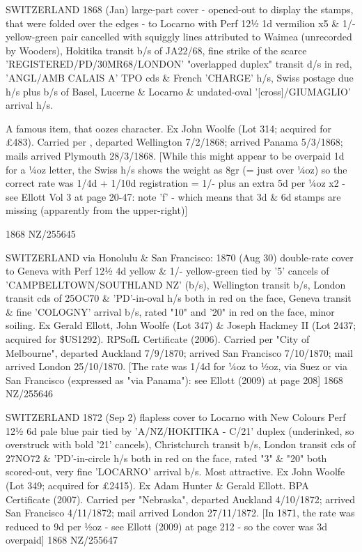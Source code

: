 \documentclass[justified]{tufte-book}
\begin{document}
%
{SWITZERLAND 1868 (Jan) large-part cover - opened-out to display the stamps, that were folded over the edges - to Locarno with Perf 12½ 1d vermilion x5 \& 1/- yellow-green pair cancelled with squiggly lines attributed to Waimea (unrecorded by Wooders), Hokitika transit b/s of JA22/68, fine strike of the scarce 'REGISTERED/PD/30MR68/LONDON' "overlapped duplex" transit d/s in red, 'ANGL/AMB CALAIS A' TPO cds \& French 'CHARGE' h/s, Swiss postage due h/s plus b/s of Basel, Lucerne \& Locarno \& undated-oval '[cross]/GIUMAGLIO' arrival h/s. 

A famous item, that oozes character. Ex John Woolfe (Lot 314; acquired for £483). Carried per , departed Wellington 7/2/1868; arrived Panama 5/3/1868; mails arrived Plymouth 28/3/1868. [While this might appear to be overpaid 1d for a ¼oz letter, the Swiss h/s shows the weight as 8gr (= just over ¼oz) so the correct rate was 1/4d + 1/10d registration = 1/- plus an extra 5d per ¼oz x2 - see Ellott Vol 3 at page 20-47: note 'f' - which means that 3d \& 6d stamps are missing (apparently from the upper-right)]}%
{1868}%
{NZ/255645}%
{}%
{}
{}%
{}

%
{SWITZERLAND via Honolulu \& San Francisco: 1870 (Aug 30) double-rate cover to Geneva with Perf 12½ 4d yellow \& 1/- yellow-green tied by '5' cancels of 'CAMPBELLTOWN/SOUTHLAND NZ' (b/s), Wellington transit b/s, London transit cds of 25OC70 \& 'PD'-in-oval h/s both in red on the face, Geneva transit \& fine 'COLOGNY' arrival b/s, rated "10" and '20" in red on the face, minor soiling. Ex Gerald Ellott, John Woolfe (Lot 347) \& Joseph Hackmey II (Lot 2437; acquired for \$US1292). RPSofL Certificate (2006). Carried per "City of Melbourne", departed Auckland 7/9/1870; arrived San Francisco 7/10/1870; mail arrived London 25/10/1870. [The rate was 1/4d for ¼oz to ½oz, via Suez or via San Francisco (expressed as "via Panama"): see Ellott (2009) at page 208]}%
{1868}%
{NZ/255646}%
{}%
{}
{}%
{}

%
{SWITZERLAND 1872 (Sep 2) flapless cover to Locarno with New Colours Perf 12½ 6d pale blue pair tied by 'A/NZ/HOKITIKA - C/21' duplex (underinked, so overstruck with bold '21' cancels), Christchurch transit b/s, London transit cds of 27NO72 \& 'PD'-in-circle h/s both in red on the face, rated "3" \& "20" both scored-out, very fine 'LOCARNO' arrival b/s. Most attractive. Ex John Woolfe (Lot 349; acquired for £2415). Ex Adam Hunter \& Gerald Ellott. BPA Certificate (2007). Carried per "Nebraska", departed Auckland 4/10/1872; arrived San Francisco 4/11/1872; mail arrived London 27/11/1872. [In 1871, the rate was reduced to 9d per ½oz - see Ellott (2009) at page 212 - so the cover was 3d overpaid]}%
{1868}%
{NZ/255647}%
{}%
{}
{}%
{}
\end{document}
